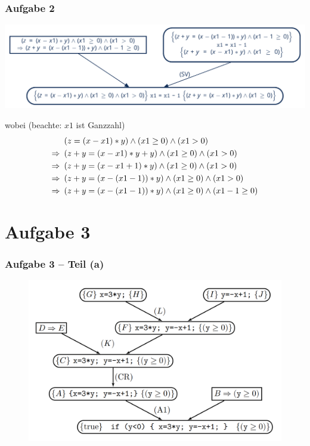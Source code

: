 \documentclass{beamer}
\begin{document}
\begin{frame} \frametitle{Aufgabe 2}
	\footnotesize
	\begin{center}
		\includegraphics[width=\linewidth]{tut12-abb}
	\end{center}
	wobei (beachte: $x1$ ist Ganzzahl)
	\begin{align*}
		&(z = (x - x1) * y) \land (x1 \ge 0) \land (x1 > 0) \\
		\Rightarrow \enskip &(z + y = (x - x1) * y + y) \land (x1 \ge 0) \land (x1 > 0) \\
		\Rightarrow \enskip &(z + y = (x - x1 + 1) * y) \land (x1 \ge 0) \land (x1 > 0) \\
		\Rightarrow \enskip &(z + y = (x - (x1 - 1)) * y) \land (x1 \ge 0) \land (x1 > 0) \\
		\Rightarrow \enskip &(z + y = (x - (x1 - 1)) * y) \land (x1 \ge 0) \land (x1 - 1 \ge 0)
	\end{align*}
\end{frame}

\section{Aufgabe 3}

\begin{frame} \frametitle{Aufgabe 3 -- Teil (a)}
	\begin{figure}
		\centering
		\includegraphics[width=\linewidth]{tut12-aufgabe3-baum.png}
	\end{figure}
\end{frame}
\end{document}
